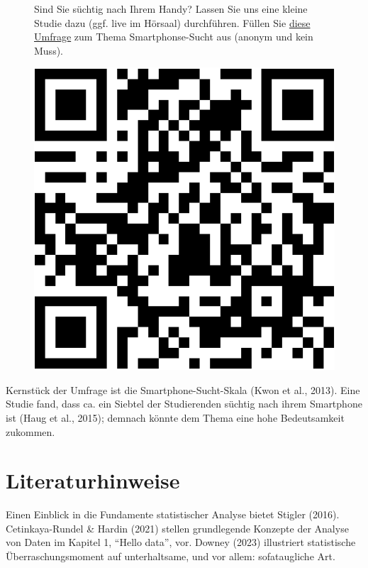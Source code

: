 \documentclass[
  letterpaper,
  oneside,
  open=any]{scrbook}
\theoremstyle{definition}
\theoremstyle{definition}
\theoremstyle{definition}
\theoremstyle{remark}
\begin{document}
\begin{figure}

\begin{minipage}{0.80\linewidth}
Sind Sie süchtig nach Ihrem Handy? Lassen Sie uns eine kleine Studie
dazu (ggf. live im Hörsaal) durchführen. Füllen Sie
\href{https://forms.gle/PP8yb6Ubqq3JU78F9}{diese Umfrage} zum Thema
Smartphonse-Sucht aus (anonym und kein Muss).\end{minipage}%
%
\begin{minipage}{0.20\linewidth}

\begin{center}
\includegraphics[width=0.75\linewidth,height=\textheight,keepaspectratio]{010-rahmen_files/figure-pdf/qr-google-forms-handysucht-1.pdf}
\end{center}

\end{minipage}%

\end{figure}%

Kernstück der Umfrage ist die Smartphone-Sucht-Skala (Kwon et al.,
2013). Eine Studie fand, dass ca. ein Siebtel der Studierenden süchtig
nach ihrem Smartphone ist (Haug et al., 2015); demnach könnte dem Thema
eine hohe Bedeutsamkeit zukommen.

\section{Literaturhinweise}\label{literaturhinweise}

Einen Einblick in die Fundamente statistischer Analyse bietet Stigler
(2016). Cetinkaya-Rundel \& Hardin (2021) stellen grundlegende Konzepte
der Analyse von Daten im Kapitel 1, \enquote{Hello data}, vor. Downey
(2023) illustriert statistische Überraschungsmoment auf unterhaltsame,
und vor allem: sofataugliche Art.
\end{document}
